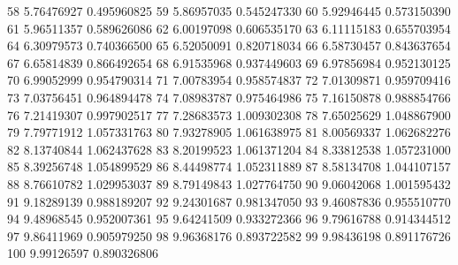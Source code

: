 \begin{Schunk}
\begin{Soutput}
58  5.76476927  0.495960825
59  5.86957035  0.545247330
60  5.92946445  0.573150390
61  5.96511357  0.589626086
62  6.00197098  0.606535170
63  6.11115183  0.655703954
64  6.30979573  0.740366500
65  6.52050091  0.820718034
66  6.58730457  0.843637654
67  6.65814839  0.866492654
68  6.91535968  0.937449603
69  6.97856984  0.952130125
70  6.99052999  0.954790314
71  7.00783954  0.958574837
72  7.01309871  0.959709416
73  7.03756451  0.964894478
74  7.08983787  0.975464986
75  7.16150878  0.988854766
76  7.21419307  0.997902517
77  7.28683573  1.009302308
78  7.65025629  1.048867900
79  7.79771912  1.057331763
80  7.93278905  1.061638975
81  8.00569337  1.062682276
82  8.13740844  1.062437628
83  8.20199523  1.061371204
84  8.33812538  1.057231000
85  8.39256748  1.054899529
86  8.44498774  1.052311889
87  8.58134708  1.044107157
88  8.76610782  1.029953037
89  8.79149843  1.027764750
90  9.06042068  1.001595432
91  9.18289139  0.988189207
92  9.24301687  0.981347050
93  9.46087836  0.955510770
94  9.48968545  0.952007361
95  9.64241509  0.933272366
96  9.79616788  0.914344512
97  9.86411969  0.905979250
98  9.96368176  0.893722582
99  9.98436198  0.891176726
100 9.99126597  0.890326806
\end{Soutput}
\end{Schunk}
